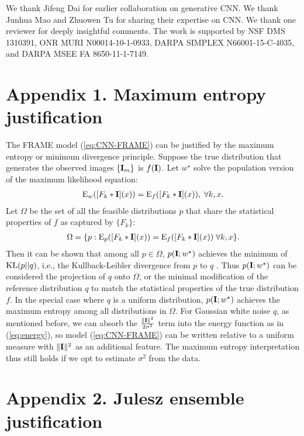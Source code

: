 \documentclass[letterpaper]{article}
\def\E{{\rm E}}
\def\I{{\bf I}}
\begin{document}
We thank Jifeng Dai for earlier collaboration on generative CNN. We thank Junhua Mao and Zhuowen Tu for sharing their expertise on CNN.  We thank one reviewer for deeply insightful comments. The work is supported by NSF DMS 1310391, ONR MURI N00014-10-1-0933, DARPA SIMPLEX  N66001-15-C-4035,  and DARPA MSEE   FA 8650-11-1-7149. 


\section*{Appendix 1.  Maximum entropy justification}

The FRAME model (\ref{eq:CNN-FRAME})  can be justified by the maximum entropy or minimum divergence principle. Suppose the true distribution that generates the observed images $\{\I_m\}$ is $f(\I)$. Let $w^{\star}$ solve  the population version of the maximum likelihood equation: 
\begin{eqnarray}
\E_{w}([F_k*\I](x)) = \E_{f}([F_k*\I](x)), \;\forall k, x. 
\end{eqnarray}
 Let $\Omega$ be the set of all the feasible distributions $p$ that share the statistical properties of $f$ as captured by $\{F_k\}$:
 \begin{eqnarray}
\Omega = \{p:  \E_{p}([F_k*\I](x)) = \E_{f}([F_k*\I](x)) \; \forall k, x\}. 
 \end{eqnarray}
Then it can be shown that among all $p \in \Omega$, $p(\I; w^{\star})$ achieves the minimum of ${\rm KL}(p||q)$, i.e., the Kullback-Leibler divergence from $p$ to $q$ \citep{della1997inducing}. Thus $p(\I; w^{\star})$ can be considered the projection of $q$ onto $\Omega$, or the minimal modification of the reference distribution $q$ to match the statistical properties of the true distribution $f$.  In the special case where $q$ is a uniform distribution, $p(\I; w^{\star})$ achieves the maximum entropy among all distributions in $\Omega$. For Gaussian white noise $q$, as mentioned before, we can absorb the $\frac{\|\I\|^2}{2\sigma^2}$ term into the energy function as in (\ref{eq:energy}), so model (\ref{eq:CNN-FRAME}) can be written relative to a uniform measure with $\|\I\|^2$ as an additional feature. The maximum entropy interpretation thus still holds if we opt to estimate $\sigma^2$ from the data. 
 
 \section*{Appendix 2.  Julesz ensemble justification}
\end{document}
